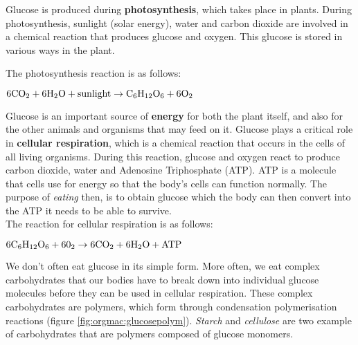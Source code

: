 Glucose is produced during \textbf{photosynthesis}, which takes place in plants. During photosynthesis, sunlight (solar energy), water and carbon dioxide are involved in a chemical reaction that produces glucose and oxygen. This glucose is stored in various ways in the plant. 

The photosynthesis reaction is as follows:

\begin{center}
$\rm{6CO_{2} + 6H_{2}O + sunlight \rightarrow C_{6}H_{12}O_{6} + 6O_{2}}$\\
\end{center}

Glucose is an important source of \textbf{energy} for both the plant itself, and also for the other animals and organisms that may feed on it. Glucose plays a critical role in \textbf{cellular respiration}, which is a chemical reaction that occurs in the cells of all living organisms. During this reaction, glucose and oxygen react to produce carbon dioxide, water and Adenosine Triphosphate (ATP). ATP is a molecule that cells use for energy so that the body's cells can function normally. The purpose of \textit{eating} then, is to obtain glucose which the body can then convert into the ATP it needs to be able to survive.\\

The reaction for cellular respiration is as follows:

\begin{center}
$\rm{6C_{6}H_{12}O_{6} + 60_{2} \rightarrow 6CO_{2} + 6H_{2}O + ATP}$\\
\end{center}


We don't often eat glucose in its simple form. More often, we eat complex carbohydrates that our bodies have to break down into individual glucose molecules before they can be used in cellular respiration. These complex carbohydrates are polymers, which form through condensation polymerisation reactions (figure \ref{fig:orgmac:glucosepolym}). \textit{Starch} and \textit{cellulose} are two example of carbohydrates that are polymers composed of glucose monomers. 

